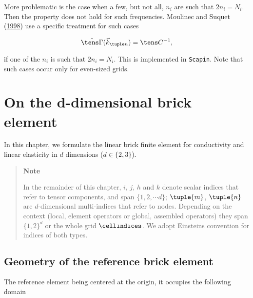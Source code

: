 \documentclass[oneside]{memoir}
\begin{document}
More problematic is the case when a few, but not all, \(n_i\) are such that \(2n_i=N_i\). Then the property does not hold for such frequencies. Moulinec and Suquet (\hyperlink{7941652814461145344}{1998}) use a specific treatment for such cases



\begin{equation*}
\begin{split}\hat{\tens\Gamma}(\vec k_{\tuple n})=\tens C^{-1},\end{split}\end{equation*}


if one of the \(n_i\) is such that \(2n_i=N_i\). This is implemented in \texttt{Scapin}. Note that such cases occur only for even-sized grids.



\hypertarget{17831501573587717000}{}


\chapter{On the d-dimensional brick element}



In this chapter, we formulate the linear brick finite element for conductivity and linear elasticity in \(d\) dimensions (\(d\in\{2, 3\}\)).



\begin{quote}
\textbf{Note}

In the remainder of this chapter, \(i\), \(j\), \(h\) and \(k\) denote scalar indices that refer to tensor components, and span \(\{1, 2, \cdots d\}\); \(\tuple{m}\), \(\tuple{n}\) are \(d\)-dimensional multi-indices that refer to nodes. Depending on the context (local, element operators or global, assembled operators) they span \(\{1, 2\}^d\) or the whole grid \(\cellindices\). We adopt Einstein{\textquotesingle}s convention for indices of both types.

\end{quote}


\hypertarget{10162273478024495150}{}


\section{Geometry of the reference brick element}



The reference element being centered at the origin, it occupies the following domain
\end{document}
